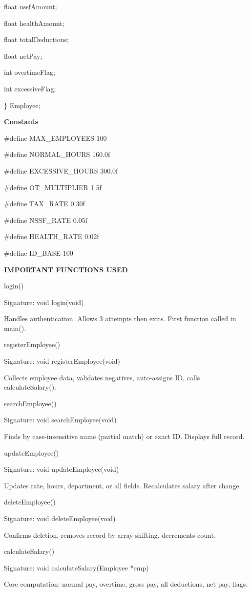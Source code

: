 \documentclass[
]{article}
\begin{document}
float nssfAmount;

float healthAmount;

float totalDeductions;

float netPay;

int overtimeFlag;

int excessiveFlag;

\} Employee;

\textbf{Constants}

\#define MAX\_EMPLOYEES 100

\#define NORMAL\_HOURS 160.0f

\#define EXCESSIVE\_HOURS 300.0f

\#define OT\_MULTIPLIER 1.5f

\#define TAX\_RATE 0.30f

\#define NSSF\_RATE 0.05f

\#define HEALTH\_RATE 0.02f

\#define ID\_BASE 100

\textbf{IMPORTANT FUNCTIONS USED}

login()

Signature: void login(void)

Handles authentication. Allows 3 attempts then exits. First function
called in main().

registerEmployee()

Signature: void registerEmployee(void)

Collects employee data, validates negatives, auto-assigns ID, calls
calculateSalary().

searchEmployee()

Signature: void searchEmployee(void)

Finds by case-insensitive name (partial match) or exact ID. Displays
full record.

updateEmployee()

Signature: void updateEmployee(void)

Updates rate, hours, department, or all fields. Recalculates salary
after change.

deleteEmployee()

Signature: void deleteEmployee(void)

Confirms deletion, removes record by array shifting, decrements count.

calculateSalary()

Signature: void calculateSalary(Employee *emp)

Core computation: normal pay, overtime, gross pay, all deductions, net
pay, flags.
\end{document}
